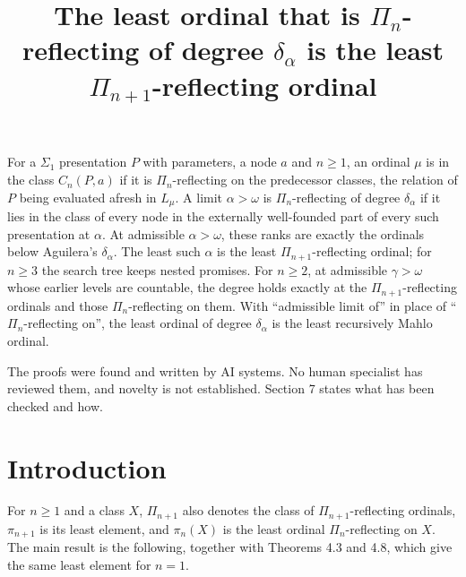 \documentclass[11pt]{article}
\title{The least ordinal that is $\Pi_n$-reflecting of degree $\delta_\alpha$ is the least $\Pi_{n+1}$-reflecting ordinal}
\date{\paperversion}
\begin{document}
\newcommand{\Ad}{\mathrm{Ad}}
\newcommand{\Lim}{\mathrm{Lim}\,}
\newcommand{\CA}{C_{\mathrm{Ad}}}
\newcommand{\Lv}{\mathcal{L}}
\newcommand{\Cert}{\mathrm{Cert}}
\newcommand{\Tab}{\mathrm{Tab}}
\maketitle

\begin{frontnote} For a $\Sigma_1$ presentation $P$ with parameters, a node $a$ and $n \ge 1$, an
ordinal $\mu$ is in the class $C_n(P,a)$ if it is $\Pi_n$-reflecting on the predecessor classes, the
relation of $P$ being evaluated afresh in $L_\mu$. A limit $\alpha > \omega$ is $\Pi_n$-reflecting of degree $\delta_\alpha$
if it lies in the class of every node in the externally well-founded part of every such presentation at $\alpha$.
At admissible $\alpha > \omega$, these ranks are exactly the ordinals below Aguilera's $\delta_\alpha$.
The least such $\alpha$ is the least $\Pi_{n+1}$-reflecting ordinal; for $n \ge 3$ the search tree keeps nested promises.
For $n \ge 2$, at admissible $\gamma > \omega$ whose earlier levels are countable, the degree holds
exactly at the $\Pi_{n+1}$-reflecting ordinals and those $\Pi_n$-reflecting on them.
With ``admissible limit of'' in place of ``$\Pi_n$-reflecting on'', the least ordinal of degree $\delta_\alpha$
is the least recursively Mahlo ordinal.
\end{frontnote}

\begin{frontnote} The proofs were found and written by AI systems. No human specialist has
reviewed them, and novelty is not established. Section 7 states what has been checked and how.
\end{frontnote}

\section{Introduction}

For $n \ge 1$ and a class $X$, $\Pi_{n+1}$ also denotes the class of $\Pi_{n+1}$-reflecting ordinals,
$\pi_{n+1}$ is its least element, and $\pi_n(X)$ is the least ordinal $\Pi_n$-reflecting on $X$. The main result is the
following, together with Theorems 4.3 and 4.8, which give the same least element for $n = 1$.
\end{document}
